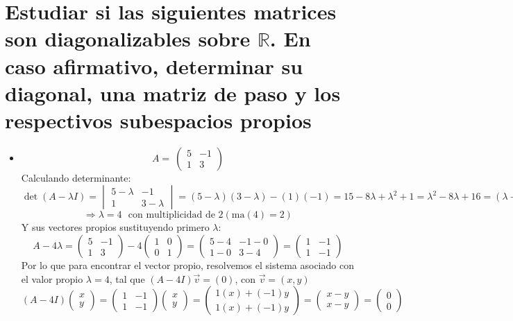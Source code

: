 \section{Estudiar si las siguientes matrices son diagonalizables sobre $\mathbb{R}$. En caso afirmativo, determinar su diagonal, una matriz de paso y los respectivos subespacios propios}

\begin{itemize}
    \item $$A=\:\begin{pmatrix}5&-1\\ 1&3\end{pmatrix}$$
    Calculando determinante:
    $$\det(A-\lambda I)= \begin{vmatrix}5-\lambda&-1\\ 1&3-\lambda\end{vmatrix}=(5-\lambda)(3-\lambda)-(1)(-1)=15-8\lambda+\lambda^2+1=\lambda^2-8\lambda+16=(\lambda-4)^2=0$$
    $$\Longrightarrow \lambda=4~~~ \mbox{con multiplicidad de 2}(\text{ma}(4)=2)$$
    Y sus vectores propios sustituyendo primero $\lambda$:
    $$A-4\lambda=\begin{pmatrix}5&-1\\ 1&3\end{pmatrix}-4\begin{pmatrix}1&0\\ 0&1\end{pmatrix}=\begin{pmatrix}5-4&-1-0\\ 1-0&3-4\end{pmatrix}=\begin{pmatrix}1&-1\\ 1&-1\end{pmatrix}$$
    Por lo que para encontrar el vector propio, resolvemos el sistema asociado con el valor propio $\lambda=4$, tal que $(A-4I)\vec{v}=(0)$, con $\vec{v}=(x,y)$
    $$\left(A-4I\right)\begin{pmatrix}x\\ y\end{pmatrix}=\begin{pmatrix}1&-1\\1&-1\end{pmatrix}\begin{pmatrix}x\\ y\end{pmatrix}=\begin{pmatrix}1(x)+(-1)y\\1(x)+(-1)y\end{pmatrix}=\begin{pmatrix}x-y\\ x-y\end{pmatrix}=\begin{pmatrix}0\\ 0\end{pmatrix}$$

\end{itemize}

